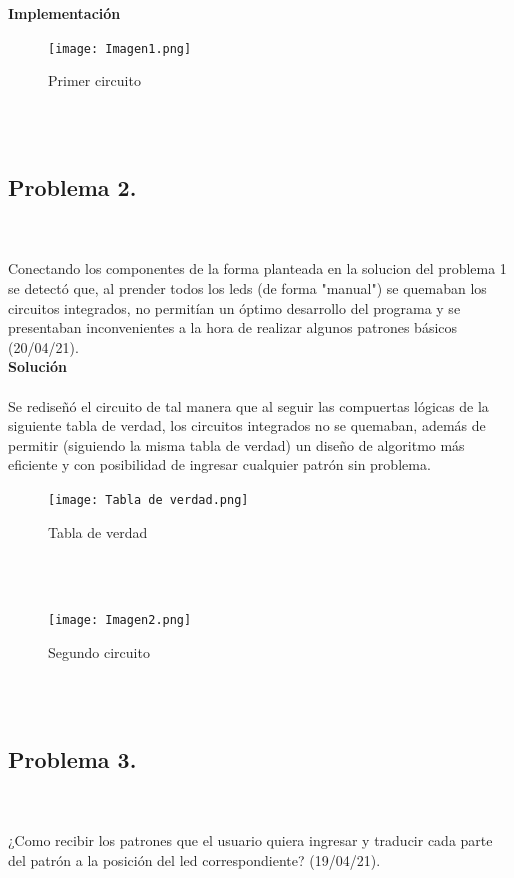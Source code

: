 \documentclass{article}
\begin{document}
\textbf{\large Implementación}\\
\begin{figure}[h]
    \texttt{[image: Imagen1.png]}
    \centering
    \caption{Primer circuito}
    \label{fig:Imagen1}
\end{figure}\\\\

\subsection{\large Problema 2.}\\\\
Conectando los componentes de la forma planteada en la solucion del problema 1 se detectó que, al prender todos los leds (de forma "manual") se quemaban los circuitos integrados, no permitían un óptimo desarrollo del programa y se presentaban inconvenientes a la hora de realizar algunos patrones básicos (20/04/21).\\


\textbf{\large Solución}\\\\
Se rediseñó el circuito de tal manera que al seguir las compuertas lógicas de la siguiente tabla de verdad, los circuitos integrados no se quemaban, además de permitir (siguiendo la misma tabla de verdad) un diseño de algoritmo más eficiente y con posibilidad de ingresar cualquier patrón sin problema.\\

\begin{figure}[h]
    \texttt{[image: Tabla de verdad.png]}
    \centering
    \caption{Tabla de verdad}
    \label{fig:Tabla de verdad}
\end{figure}\\\\

\begin{figure}[h]
    \texttt{[image: Imagen2.png]}
    \centering
    \caption{Segundo circuito}
    \label{fig:Imagen2}
\end{figure}\\\\

\subsection{\large Problema 3.}\\\\
¿Como recibir los patrones que el usuario quiera ingresar y traducir cada parte del patrón a la posición del led correspondiente? (19/04/21).\\
\\\\\
\\
\end{document}

